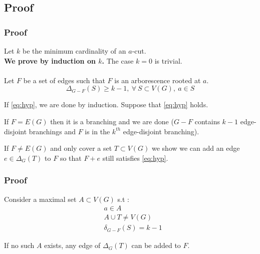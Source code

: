 \documentclass[8pt]{beamer}
\begin{document}
\subsection{Proof}
\begin{frame}
\frametitle{Proof}

Let $k$ be the minimum cardinality of an $a$-cut.\\
\textbf{We prove by induction on $k$.}
The case $k = 0$ is trivial.\\~\\


Let $F$ be a set of edges such that $F$ is an arborescence rooted at $a$.
\begin{equation}
    \Delta_{G-F}(S) \ge k-1,\ \forall\ S \subset V(G),\ a\in S  \label{eq:hyp}
\end{equation}

If \eqref{eq:hyp}, we are done by induction.
Suppose that \eqref{eq:hyp} holds.

If $F = E(G)$ then it is a branching and we are done ($G-F$ contains $k-1$ edge-disjoint branchings and $F$ is in the $k^{th}$ edge-disjoint branching).

If $F \neq E(G)$ and only cover a set $T \subset V(G)$ 
we show we can add an edge $e \in \Delta_G(T)$ to $F$ so that $F + e$ still satisfies \eqref{eq:hyp}.


\end{frame}

\begin{frame}
\frametitle{Proof}
Consider a maximal set $A\subset V(G)$ s.t :
\begin{subequations}
\begin{align}
    & a \in A \\ 
    & A \cup T \ne V(G) \\ 
    & \delta_{G-F}(S) = k - 1 
\end{align}
\end{subequations}

If no such $A$ exists, any edge of $\Delta_G(T)$ can be added to $F$.

\end{frame}
\end{document}
